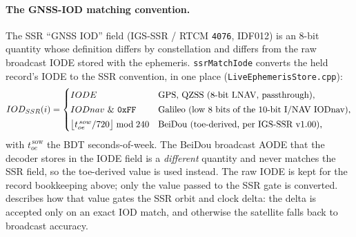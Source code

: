 \documentclass[main.tex]{subfiles}
\begin{document}
\paragraph{The GNSS-IOD matching convention.}
The SSR ``GNSS IOD'' field (IGS-SSR / RTCM \texttt{4076}, IDF012) is an
$8$-bit quantity whose definition differs by constellation and differs
from the raw broadcast IODE stored with the ephemeris.
\texttt{ssrMatchIode} converts the held record's IODE to the SSR
convention, in one place (\texttt{LiveEphemerisStore.cpp}):
\begin{equation}
IOD_{SSR}(i)
=
\begin{cases}
IODE & \text{GPS, QZSS (8-bit LNAV, passthrough),}\\[2pt]
IODnav\ \&\ \mathtt{0xFF}
              & \text{Galileo (low 8 bits of the 10-bit I/NAV IODnav),}\\[2pt]
\bigl\lfloor t_{oe}^{\,sow}/720\bigr\rfloor \bmod 240
              & \text{BeiDou (toe-derived, per IGS-SSR v1.00),}
\end{cases}
\label{eq:prod-ssr-iode-map}
\end{equation}
with $t_{oe}^{\,\mathrm{sow}}$ the BDT seconds-of-week.  The BeiDou
broadcast AODE that the decoder stores in the IODE field is a
\emph{different} quantity and never matches the SSR field, so the
toe-derived value is used instead.  The raw IODE is kept for the record
bookkeeping above; only the value passed to the SSR gate is converted.
 describes how that value
gates the SSR orbit and clock delta: the delta is accepted only on an
exact IOD match, and otherwise the satellite falls back to broadcast
accuracy.

\ifSubfilesClassLoaded{\printbibliography}{}
\end{document}
